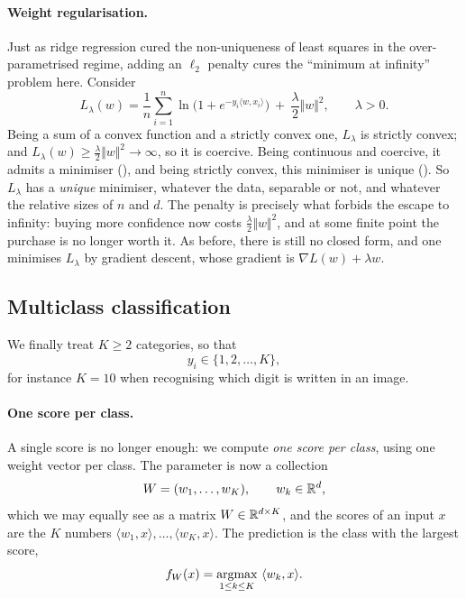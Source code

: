 \paragraph{Weight regularisation.}
Just as ridge regression cured the non-uniqueness of least squares in the
over-parametrised regime, adding an $\ell_2$ penalty cures the ``minimum at infinity''
problem here. Consider
\[
L_\lambda(w) = \frac{1}{n} \sum_{i=1}^n \ln\big( 1 + e^{- y_i \langle w, x_i \rangle} \big)
\ + \ \frac{\lambda}{2} \Vert w \Vert^2 , \qquad \lambda > 0 .
\]
Being a sum of a convex function and a strictly convex one, $L_\lambda$ is strictly
convex; and $L_\lambda(w) \geq \frac{\lambda}{2}\Vert w \Vert^2 \to \infty$, so it is
coercive. Being continuous and coercive, it admits a minimiser
(), and being strictly convex, this minimiser is unique
(). So $L_\lambda$ has a \emph{unique} minimiser, whatever the data, separable or not, and whatever the
relative sizes of $n$ and $d$. The penalty is precisely what forbids the escape to
infinity: buying more confidence now costs $\frac{\lambda}{2}\Vert w \Vert^2$, and at
some finite point the purchase is no longer worth it. As before, there is still no
closed form, and one minimises $L_\lambda$ by gradient descent, whose gradient is
$\nabla L(w) + \lambda w$.


\subsection{Multiclass classification}
\label{subsec:multiclass}

We finally treat $K \geq 2$ categories, so that
\[
y_i \in \{1, 2, \dots, K\} ,
\]
for instance $K = 10$ when recognising which digit is written in an image.

\paragraph{One score per class.}
A single score is no longer enough: we compute \emph{one score per class}, using one
weight vector per class. The parameter is now a collection
\[
W = (w_1, \dots, w_K), \qquad w_k \in \mathbb{R}^d ,
\]
which we may equally see as a matrix $W \in \mathbb{R}^{d \times K}$, and the scores of an
input $x$ are the $K$ numbers $\langle w_1, x \rangle, \dots, \langle w_K, x \rangle$.
The prediction is the class with the largest score,
\[
f_W(x) = \operatorname*{argmax}_{1 \leq k \leq K} \ \langle w_k, x \rangle .
\]


